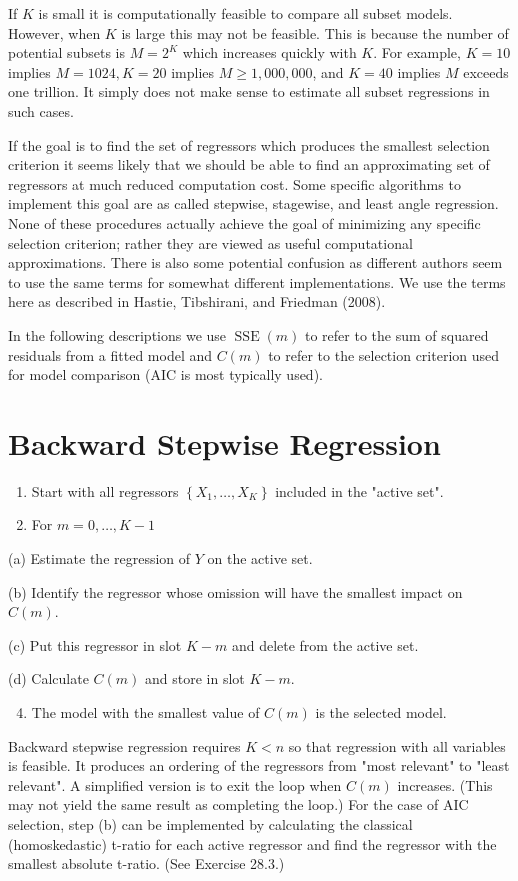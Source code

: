 \documentclass[10pt]{article}
\begin{document}
If $K$ is small it is computationally feasible to compare all subset models. However, when $K$ is large this may not be feasible. This is because the number of potential subsets is $M=2^{K}$ which increases quickly with $K$. For example, $K=10$ implies $M=1024, K=20$ implies $M \geq 1,000,000$, and $K=40$ implies $M$ exceeds one trillion. It simply does not make sense to estimate all subset regressions in such cases.

If the goal is to find the set of regressors which produces the smallest selection criterion it seems likely that we should be able to find an approximating set of regressors at much reduced computation cost. Some specific algorithms to implement this goal are as called stepwise, stagewise, and least angle regression. None of these procedures actually achieve the goal of minimizing any specific selection criterion; rather they are viewed as useful computational approximations. There is also some potential confusion as different authors seem to use the same terms for somewhat different implementations. We use the terms here as described in Hastie, Tibshirani, and Friedman (2008).

In the following descriptions we use $\operatorname{SSE}(m)$ to refer to the sum of squared residuals from a fitted model and $C(m)$ to refer to the selection criterion used for model comparison (AIC is most typically used).

\section{Backward Stepwise Regression}
\begin{enumerate}
  \item Start with all regressors $\left\{X_{1}, \ldots, X_{K}\right\}$ included in the "active set".

  \item For $m=0, \ldots, K-1$

\end{enumerate}
(a) Estimate the regression of $Y$ on the active set.

(b) Identify the regressor whose omission will have the smallest impact on $C(m)$.

(c) Put this regressor in slot $K-m$ and delete from the active set.

(d) Calculate $C(m)$ and store in slot $K-m$.

\begin{enumerate}
  \setcounter{enumi}{3}
  \item The model with the smallest value of $C(m)$ is the selected model.
\end{enumerate}
Backward stepwise regression requires $K<n$ so that regression with all variables is feasible. It produces an ordering of the regressors from "most relevant" to "least relevant". A simplified version is to exit the loop when $C(m)$ increases. (This may not yield the same result as completing the loop.) For the case of AIC selection, step (b) can be implemented by calculating the classical (homoskedastic) t-ratio for each active regressor and find the regressor with the smallest absolute t-ratio. (See Exercise 28.3.)
\end{document}
